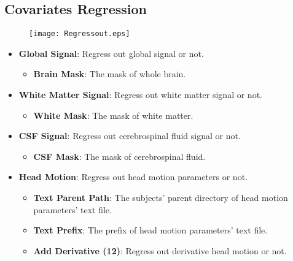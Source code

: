 \documentclass[11pt]{article}
\begin{document}
		\subsection{Covariates Regression}
			\begin{figure}
				\begin{center}
					\texttt{[image: Regressout.eps]}
				\end{center}
			\end{figure}
			\begin{itemize}
				\item \textbf{Global Signal}: Regress out global signal or not.
					\begin{itemize}
						\item \textbf{Brain Mask}: The mask of whole brain.
					\end{itemize}
				\item \textbf{White Matter Signal}: Regress out white matter signal or not.
					\begin{itemize}
						\item \textbf{White Mask}: The mask of white matter.
					\end{itemize}
				\item \textbf{CSF Signal}: Regress out cerebrospinal fluid signal or not.
					\begin{itemize}
						\item \textbf{CSF Mask}: The mask of cerebrospinal fluid.
					\end{itemize}
				\item \textbf{Head Motion}: Regress out head motion parameters or not.
					\begin{itemize}
						\item \textbf{Text Parent Path}: The subjects' parent directory of head motion parameters' text file.
						\item \textbf{Text Prefix}: The prefix of head motion parameters' text file.
						\item \textbf{Add Derivative (12)}: Regress out derivative head motion or not.
					\end{itemize}
			\end{itemize}
\end{document}
